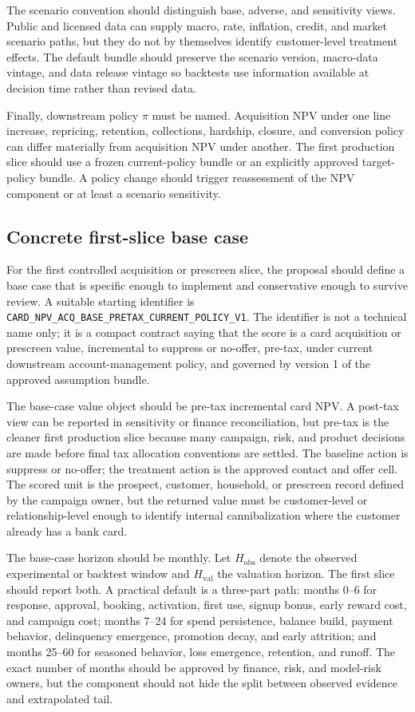 \documentclass[11pt]{article}
\newcommand{\1}{\mathbf{1}}
\newcommand{\code}[1]{\nolinkurl{#1}}
\begin{document}
The scenario convention should distinguish base, adverse, and sensitivity
views. Public and licensed data can supply macro, rate, inflation, credit, and
market scenario paths, but they do not by themselves identify customer-level
treatment effects. The default bundle should preserve the scenario version,
macro-data vintage, and data release vintage so backtests use information
available at decision time rather than revised data.

Finally, downstream policy $\pi$ must be named. Acquisition NPV under one line
increase, repricing, retention, collections, hardship, closure, and conversion
policy can differ materially from acquisition NPV under another. The first
production slice should use a frozen current-policy bundle or an explicitly
approved target-policy bundle. A policy change should trigger reassessment of
the NPV component or at least a scenario sensitivity.

\subsection{Concrete first-slice base case}
\label{subsec:first-slice-valuation-base}

For the first controlled acquisition or prescreen slice, the proposal should
define a base case that is specific enough to implement and conservative
enough to survive review. A suitable starting identifier is
\code{CARD_NPV_ACQ_BASE_PRETAX_CURRENT_POLICY_V1}. The identifier is not a
technical name only; it is a compact contract saying that the score is a card
acquisition or prescreen value, incremental to suppress or no-offer, pre-tax,
under current downstream account-management policy, and governed by version 1
of the approved assumption bundle.

The base-case value object should be pre-tax incremental card NPV. A post-tax
view can be reported in sensitivity or finance reconciliation, but pre-tax is
the cleaner first production slice because many campaign, risk, and product
decisions are made before final tax allocation conventions are settled. The
baseline action is suppress or no-offer; the treatment action is the approved
contact and offer cell. The scored unit is the prospect, customer, household,
or prescreen record defined by the campaign owner, but the returned value must
be customer-level or relationship-level enough to identify internal
cannibalization where the customer already has a bank card.

The base-case horizon should be monthly. Let $H_{\mathrm{obs}}$ denote the
observed experimental or backtest window and $H_{\mathrm{val}}$ the valuation
horizon. The first slice should report both. A practical default is a
three-part path: months 0--6 for response, approval, booking, activation,
first use, signup bonus, early reward cost, and campaign cost; months 7--24
for spend persistence, balance build, payment behavior, delinquency emergence,
promotion decay, and early attrition; and months 25--60 for seasoned behavior,
loss emergence, retention, and runoff. The exact number of months should be
approved by finance, risk, and model-risk owners, but the component should not
hide the split between observed evidence and extrapolated tail.
\end{document}
